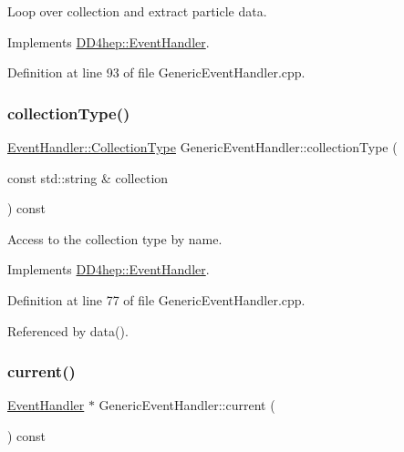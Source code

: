 Loop over collection and extract particle data. 



Implements \hyperlink{class_d_d4hep_1_1_event_handler_ae43595c2760736a7ca628183a2c91ec2}{D\+D4hep\+::\+Event\+Handler}.



Definition at line 93 of file Generic\+Event\+Handler.\+cpp.

\hypertarget{class_d_d4hep_1_1_generic_event_handler_aeb30b8fc7e8e850fa7472fc70443b817}{}\label{class_d_d4hep_1_1_generic_event_handler_aeb30b8fc7e8e850fa7472fc70443b817} 
\subsubsection{\texorpdfstring{collection\+Type()}{collectionType()}}
{\footnotesize\ttfamily \hyperlink{class_d_d4hep_1_1_event_handler_a0b22a141a019364495835317fad48254}{Event\+Handler\+::\+Collection\+Type} Generic\+Event\+Handler\+::collection\+Type (\begin{DoxyParamCaption}\item[{const std\+::string \&}]{collection }\end{DoxyParamCaption}) const\hspace{0.3cm}{\ttfamily [virtual]}}



Access to the collection type by name. 



Implements \hyperlink{class_d_d4hep_1_1_event_handler_a8424ffc2056b0e23d69c81ab2496cd51}{D\+D4hep\+::\+Event\+Handler}.



Definition at line 77 of file Generic\+Event\+Handler.\+cpp.



Referenced by data().

\hypertarget{class_d_d4hep_1_1_generic_event_handler_a4270bee117c5e39703a6f29e3e31d029}{}\label{class_d_d4hep_1_1_generic_event_handler_a4270bee117c5e39703a6f29e3e31d029} 
\subsubsection{\texorpdfstring{current()}{current()}}
{\footnotesize\ttfamily \hyperlink{class_d_d4hep_1_1_event_handler}{Event\+Handler} $\ast$ Generic\+Event\+Handler\+::current (\begin{DoxyParamCaption}{ }\end{DoxyParamCaption}) const\hspace{0.3cm}{\ttfamily [protected]}}



